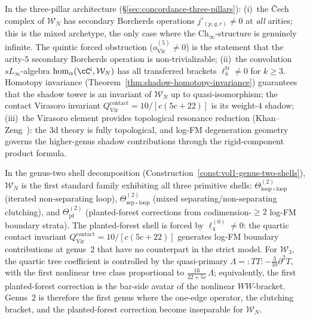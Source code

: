 \begin{remark}
\label{rem:w-three-pillar}
In the three-pillar architecture
(\S\ref{sec:concordance-three-pillars}):
(i)~the \v{C}ech complex of $\mathcal{W}_N$ has secondary Borcherds
operations $j'_{(p,q,r)} \neq 0$ at \emph{all} arities; this is
the mixed archetype, the only case where the
$\mathrm{Ch}_\infty$-structure is genuinely infinite.  The quintic
forced obstruction ($o^{(5)}_{\mathrm{Vir}} \neq 0$) is the
statement that the arity-$5$ secondary Borcherds operation is
non-trivializable;
(ii)~the convolution $sL_\infty$-algebra
$\operatorname{hom}_\alpha(\cC^{\textup{!`}}, \mathcal{W}_N)$ has
all transferred brackets $\ell_k^{\mathrm{tr}} \neq 0$ for $k \geq 3$.
Homotopy invariance (Theorem~\ref{thm:shadow-homotopy-invariance})
guarantees that the shadow tower is an invariant of
$\mathcal{W}_N$ up to quasi-isomorphism; the contact Virasoro invariant
$Q^{\mathrm{contact}}_{\mathrm{Vir}} = 10/[c(5c+22)]$ is its
weight-$4$ shadow;
(iii)~the Virasoro element provides topological resonance reduction
(Khan--Zeng~\cite{KZ25}): the 3d theory is fully topological, and
log-FM degeneration geometry governs the higher-genus shadow
contributions through the rigid-component product formula.
\end{remark}

\begin{remark}
\label{rem:w-genus-two-shells}
In the genus-two shell decomposition
(Construction~\ref{const:vol1-genus-two-shells}),
$\mathcal{W}_N$ is the first standard family exhibiting all three
primitive shells:
$\Theta^{(2)}_{\mathrm{loop} \circ \mathrm{loop}}$ (iterated
non-separating loop),
$\Theta^{(2)}_{\mathrm{sep} \circ \mathrm{loop}}$ (mixed
separating/non-separating clutching), and
$\Theta^{(2)}_{\mathrm{pf}}$ (planted-forest corrections from
codimension-${\geq}2$ log-FM boundary strata).  The planted-forest
shell is forced by $\ell_4^{(0)} \neq 0$: the quartic contact
invariant $Q^{\mathrm{contact}}_{\mathrm{Vir}} =
10/[c(5c+22)]$ generates log-FM boundary contributions at genus~$2$
that have no counterpart in the strict model.
For $\mathcal{W}_3$, the quartic tree coefficient is
controlled by the quasi-primary
$\Lambda = {:}TT{:} - \tfrac{3}{10}\partial^2 T$, with the first
nonlinear tree class proportional to
$\tfrac{16}{22+5c}\,\Lambda$; equivalently, the first
planted-forest correction is the bar-side avatar of the nonlinear
$WW$-bracket.
Genus~$2$ is therefore the first genus where the one-edge operator,
the clutching bracket, and the planted-forest correction become
inseparable for $\mathcal{W}_N$.
\end{remark}

